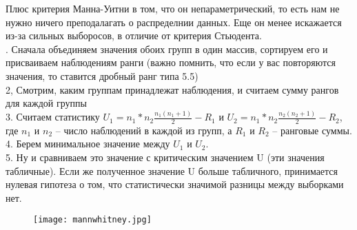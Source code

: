 Плюс критерия Манна-Уитни в том, что он непараметрический, то есть нам не нужно ничего преподалагать о распределнии данных. Еще он менее искажается из-за сильных выборосов, в отличие от критерия Стьюдента.\\ 

. Сначала объединяем значения обоих групп в один массив, сортируем его и присваиваем наблюдениям ранги (важно помнить, что если у вас повторяются значения, то ставится дробный ранг типа 5.5) \\ 
2, Смотрим, каким группам принадлежат наблюдения, и считаем сумму рангов для каждой группы \\ 
3. Считаем статистику $U_{1} = n_{1}*n_{2}\frac{n_{1}(n_{1} + 1)}{2} - R_{1}$ и $U_{2} = n_{1}*n_{2}\frac{n_{2}(n_{2} + 1)}{2} - R_{2}$, где $n_{1}$ и $n_{2}$ -- число наблюдений в каждой из групп, а $R_{1}$ и $R_{2}$ -- ранговые суммы. \\
4. Берем минимальное значение между $U_{1}$ и $U_{2}$. \\ 
5. Ну и сравниваем это значение с критическим значением U (эти значения табличные). Если же полученное значение U больше табличного, принимается нулевая гипотеза о том, что статистически значимой разницы между выборками нет. 

\begin{figure}[H]
	\centering
	\texttt{[image: mannwhitney.jpg]}
\end{figure}
	

